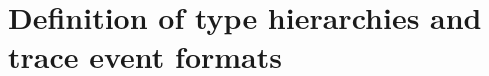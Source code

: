 \documentclass[11pt,twoside]{report}
\begin{document}
\chapter{Definition of type hierarchies and trace event formats}
\label{chap:format}


%




\end{document}
